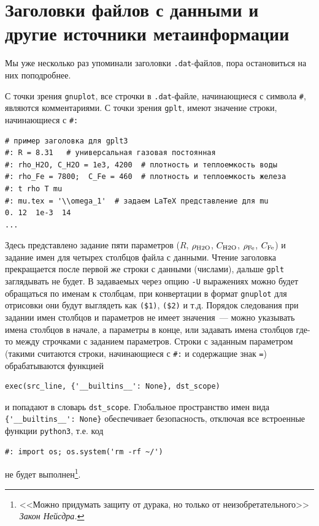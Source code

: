 \documentclass[12pt]{article}
\def\gplt{{\tt gplt}}
\def\gnuplot{{\tt gnuplot}}
\def\python{{\tt python3}}
\begin{document}
\section{Заголовки файлов с данными и другие источники метаинформации}\label{metainfo:sec}
\begin{figure}
  \vphantom{.}
  \vspace{-1.2cm}

\end{figure}
Мы уже несколько раз упоминали заголовки \verb'.dat'-файлов, пора остановиться на них поподробнее.

С точки зрения \gnuplot, все строчки в \verb'.dat'-файле, начинающиеся с символа \verb'#', являются комментариями. С точки зрения \gplt{},
имеют значение строки, начинающиеся с \verb'#:'
\begin{verbatim}
# пример заголовка для gplt3
#: R = 8.31   # универсальная газовая постоянная
#: rho_H2O, C_H2O = 1e3, 4200  # плотность и теплоемкость воды
#: rho_Fe = 7800;  C_Fe = 460  # плотность и теплоемкость железа
#: t rho T mu
#: mu.tex = '\\omega_1'  # задаем LaTeX представление для mu
0. 12  1e-3  14
...
\end{verbatim}
Здесь представлено задание пяти параметров ($R$, $\rho_{\rm H2O}$, $C_{\rm H2O}$, $\rho_{\rm Fe}$, $C_{\rm Fe}$) и задание имен для четырех столбцов файла с данными.
Чтение заголовка прекращается после первой же строки с данными (числами), дальше \gplt{} заглядывать не будет. В задаваемых через опцию \verb'-U'
выражениях можно будет обращаться по именам к столбцам, при конвертации в формат \gnuplot{} для отрисовки они будут выглядеть как \verb'($1)', \verb'($2)' и т.д.
Порядок следования при задании имен столбцов и параметров не имеет значения~--- можно указывать имена столбцов в начале, а параметры в конце, или задавать имена столбцов
где-то между строчками с заданием параметров. Строки с заданным параметром (такими считаются строки, начинающиеся с \verb'#:' и содержащие знак \verb'=')
обрабатываются функцией
\begin{verbatim}
exec(src_line, {'__builtins__': None}, dst_scope)
\end{verbatim}
и попадают в словарь \verb'dst_scope'. Глобальное пространство имен вида \verb|{'__builtins__': None}| обеспечивает безопасность, отключая все
встроенные функции \python{}, т.е. код
\begin{verbatim}
#: import os; os.system('rm -rf ~/')
\end{verbatim}
не будет выполнен\footnote{<<Можно придумать защиту от дурака, но только от неизобретательного>> {\it Закон Нейсдра.}}. 
\end{document}
